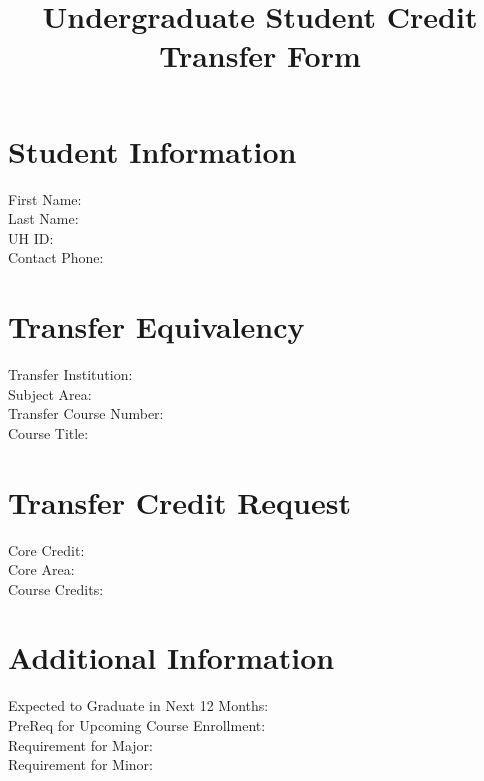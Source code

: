 \documentclass{article}
\begin{document}
\title{Undergraduate Student Credit Transfer Form}
\maketitle

\section*{Student Information}
First Name: \underline{\hspace{5cm}} \\
Last Name: \underline{\hspace{5cm}} \\
UH ID: \underline{\hspace{5cm}} \\
Contact Phone: \underline{\hspace{5cm}} \\

\section*{Transfer Equivalency}
Transfer Institution: \underline{\hspace{5cm}} \\
Subject Area: \underline{\hspace{5cm}} \\
Transfer Course Number: \underline{\hspace{5cm}} \\
Course Title: \underline{\hspace{5cm}} \\

\section*{Transfer Credit Request}
Core Credit: \underline{\hspace{5cm}} \\
Core Area: \underline{\hspace{5cm}} \\
Course Credits: \underline{\hspace{5cm}} \\

\section*{Additional Information}
Expected to Graduate in Next 12 Months: \underline{\hspace{5cm}} \\
PreReq for Upcoming Course Enrollment: \underline{\hspace{5cm}} \\
Requirement for Major: \underline{\hspace{5cm}} \\
Requirement for Minor: \underline{\hspace{5cm}} \\
\end{document}
